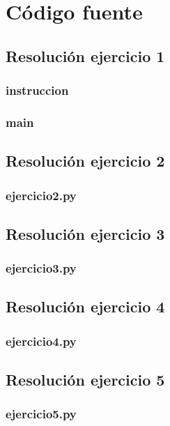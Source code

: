 \documentclass[11pt,a4paper]{article}
\begin{document}
\newpage
\appendix
\section{Código fuente}\label{appendix_codigo_fuente}

	\subsection{Resolución ejercicio 1}\label{ejercicio_1}
		\subsubsection{instruccion}
			
		\subsubsection{main}
			
	\newpage

	\subsection{Resolución ejercicio 2}\label{ejercicio_2}
		\subsubsection{ejercicio2.py}
			

	\newpage

	\subsection{Resolución ejercicio 3}\label{ejercicio_3}
		\subsubsection{ejercicio3.py}
			

	\newpage

	\subsection{Resolución ejercicio 4}\label{ejercicio_4}
		\subsubsection{ejercicio4.py}
			

	\newpage

	\subsection{Resolución ejercicio 5}\label{ejercicio_5}
		\subsubsection{ejercicio5.py}
			
\end{document}
